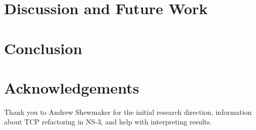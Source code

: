 \documentclass[conference]{IEEEtran}
\begin{document}
\begin{figure}[h!]
\begin{center}
\end{center}
\caption{}
\label{fig:NS2Good}
\end{figure}

\cite{RFC6582}

\section{Discussion and Future Work} 

\section{Conclusion} 

\section{Acknowledgements}

Thank you to Andrew Shewmaker for the initial research direction, information about TCP refactoring in NS-3, and help with interpreting results. 

{\small {}
}
\end{document}
